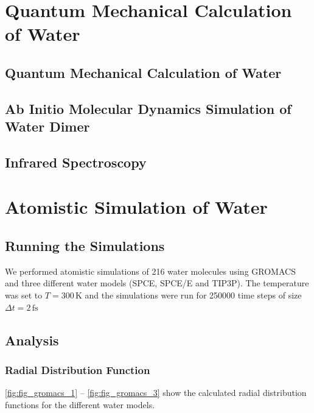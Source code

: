 \documentclass[a4paper,10pt,bibtotoc]{scrartcl}
\begin{document}
\section{Quantum Mechanical Calculation of Water}
\subsection{Quantum Mechanical Calculation of Water}
\subsection{Ab Initio Molecular Dynamics Simulation of Water Dimer}
\subsection{Infrared Spectroscopy}

\section{Atomistic Simulation of Water}
\subsection{Running the Simulations}
We performed atomistic simulations of 216 water molecules using GROMACS and three different water models (SPCE, SPCE/E and TIP3P). The temperature was set to $T=300\,\mathrm{K}$ and the simulations were run for 250000 time steps of size $\Delta t = 2\,\mathrm{fs}$

\subsection{Analysis}
\subsubsection*{Radial Distribution Function}
\autoref{fig:fig_gromacs_1} -- \autoref{fig:fig_gromacs_3} show the calculated radial distribution functions for the different water models.
\end{document}
